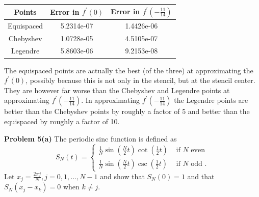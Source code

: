 \documentclass[12pt]{article}
\newcommand{\problem}[1]{\hspace{-4 ex} \large \textbf{Problem #1} }
\begin{document}
\begin{center}
	\begin{tabular}{|c|c|c|}
		\hline
		Points&Error in $f^\prime(0)$&Error in $f^\prime(-\tfrac{11}{14})$\\ \hline
		Equispaced&5.2314e-07&1.4426e-06\\ \hline
		Chebyshev&1.0728e-05&4.5105e-07\\ \hline
		Legendre&5.8603e-06&9.2153e-08\\ \hline
	\end{tabular}
\end{center}
The equispaced points are actually the best (of the three) at approximating the $f^\prime(0)$, possibly because this is not only in the stencil, but at the stencil center. They are however far worse than the Chebyshev and Legendre points at approximating $f^\prime(-\tfrac{11}{14})$. In approximating $f^\prime(-\tfrac{11}{14})$ the Legendre points are better than the Chebyshev points by roughly a factor of 5 and better than the equispaced by roughly a factor of 10.
\bigbreak

\problem{5(a)} The periodic sinc function is defined as
$$
S_N(t) = \begin{cases}
\frac{1}{N} \sin \left(\frac{N}{2}t \right) \cot \left( \frac{1}{2}t \right) & \text{ if } N \text{ even}\\
\frac{1}{N} \sin \left(\frac{N}{2}t \right) \csc \left(\frac{1}{2}t \right) & \text{ if } N \text{ odd .}
\end{cases}
$$
Let $x_j = \frac{2\pi j}{N}, j=0,1,...,N-1$ and show that $S_N(0)=1$ and that \\$S_N(x_j-x_k)=0$ when $k\neq j$.
\bigbreak
\end{document}
